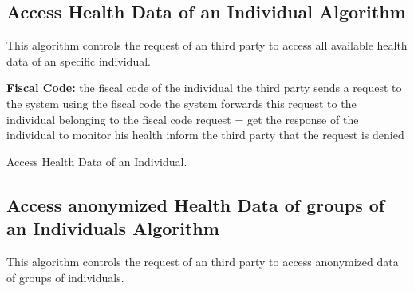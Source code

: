\documentclass[12pt]{article}
\begin{document}
\newpage
\subsection{Access Health Data of an Individual Algorithm}

This algorithm controls the request of an third party to access all available health data of an 
specific individual.
\vspace{10mm}

\begin{algorithm}[H]
 \textbf{Fiscal Code:} the fiscal code of the individual\;
 \vspace{1mm}
 the third party sends a request to the system using the fiscal code\;\vspace{1mm}
 the system forwards this request to the individual belonging to the fiscal code\;\vspace{1mm}
 request = get the response of the individual to monitor his health\; \vspace{1mm}
    {    
    inform the third party that the request is denied\;   
    }  

    
 \vspace{5mm}
 \caption{Access Health Data of an Individual.}
\end{algorithm}


\newpage
\subsection{Access anonymized Health Data of groups of an Individuals Algorithm}

This algorithm controls the request of an third party to access anonymized data of groups of individuals.
\vspace{10mm}
\end{document}
